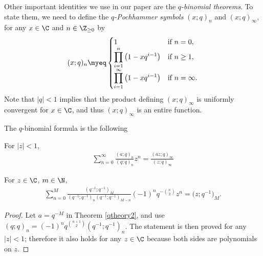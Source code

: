 Other important identities we use in our paper are the \textit{$q$-binomial theorems}. To state them, we need to def\/ine the \textit{$q$-Pochhammer symbols} $(x; q)_n$ and $(x; q)_{\infty}$, for any $x\in\C$ and $n\in\Z_{\geq 0}$ by
\begin{gather*}
(x; q)_n \myeq
 \begin{cases}
 1 & \textrm{if } n = 0,\\
 \displaystyle \prod\limits_{i=1}^n{\big(1 - xq^{i-1}\big)} & \textrm{if } n\geq 1,\\
 \displaystyle \prod\limits_{i=1}^{\infty}{\big(1 - xq^{i-1}\big)} & \textrm{if } n = \infty.
 \end{cases}
\end{gather*}
Note that $|q| < 1$ implies that the product def\/ining $(x; q)_{\infty}$ is uniformly convergent for $x\in\C$, and thus $(x; q)_{\infty}$ is an entire function.

The $q$-binomial formula is the following

\begin{thm}\label{qtheory2}
For $|z| < 1$,
\begin{gather*}
\sum_{n=0}^{\infty}{\frac{(a; q)_n}{(q; q)_n}z^n} = \frac{(az; q)_{\infty}}{(z; q)_{\infty}}
\end{gather*}
\end{thm}

\begin{cor}\label{qtheory25}
For $z\in\C$, $m\in\N$,
\begin{gather*}
\sum_{n=0}^M{\frac{(q^{-1}; q^{-1})_M}{(q^{-1}; q^{-1})_n(q^{-1}; q^{-1})_{M-n}}(-1)^nq^{-{n \choose 2}}z^n} = \big(z; q^{-1}\big)_M.
\end{gather*}
\end{cor}
\begin{proof}
Let $a = q^{-M}$ in Theorem \ref{qtheory2}, and use $(q; q)_n = (-1)^n q^{{n + 1 \choose 2}} (q^{-1}; q^{-1})_n$. The statement is then proved for any $|z| < 1$; therefore it also holds for any $z\in\C$ because both sides are polynomials on $z$.
\end{proof}
